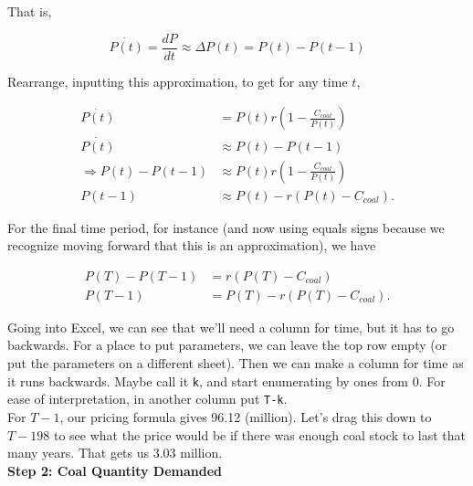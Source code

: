 \begin{enumerate}
\begin{Exercise}
\begin{sol}
        That is,
        
        \begin{equation*}
            \dot{P(t)} = \frac{dP}{dt} \approx \Delta P(t) = P(t)-P(t-1)
        \end{equation*}
        
        Rearrange, inputting this approximation, to get for any time $t$,
        
        \begin{equation*}
        \begin{split}
        \dot{P(t)} & = P(t)r\left(1-\frac{C_{coal}}{P(t)}\right)\\
        \dot{P(t)} & \approx P(t)-P(t-1) \\
        \Rightarrow P(t)-P(t-1) & \approx P(t)r\left(1-\frac{C_{coal}}{P(t)}\right) \\
        P(t-1) & \approx P(t)-r(P(t)-C_{coal}).
        \end{split}
    \end{equation*}
        
        For the final time period, for instance (and now using equals signs because we recognize moving forward that this is an approximation), we have
        
         \begin{equation}
            \begin{split}
            P(T)-P(T-1) & = r(P(T)-C_{coal})\\
            P(T-1) & = P(T)-r(P(T)-C_{coal}).
            \end{split}
            \label{eq:pricepathcoal}
        \end{equation}       
        
        Going into Excel, we can see that we'll need a column for time, but it has to go backwards. For a place to put parameters, we can leave the top row empty (or put the parameters on a different sheet). Then we can make a column for time as it runs backwards. Maybe call it \texttt{k}, and start enumerating by ones from 0. For ease of interpretation, in another column put \texttt{T-k}.\\
        
        For $T-1$, our pricing formula gives 96.12 (million). Let's drag this down to $T-198$ to see what the price would be if there was enough coal stock to last that many years. That gets us 3.03 million.\\
        
        \textbf{Step 2: Coal Quantity Demanded}\\
        

\end{sol}
\end{Exercise}
\end{enumerate}
